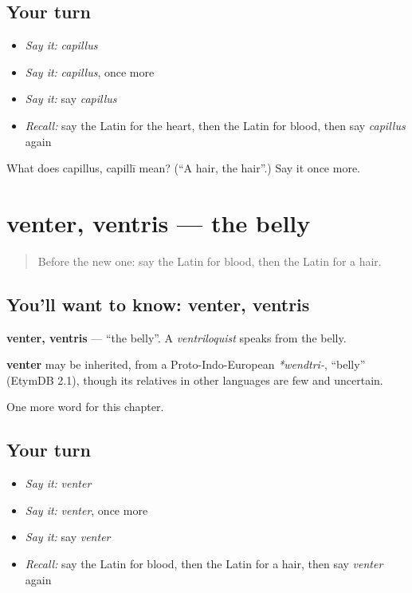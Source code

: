 \subsection*{Your turn}
\begin{itemize}
\raggedright
  \item \emph{Say it:} \emph{capillus}
  \item \emph{Say it:} \emph{capillus}, once more
  \item \emph{Say it:} say \emph{capillus}
  \item \emph{Recall:} say the Latin for the heart, then the Latin for blood, then say \emph{capillus} again
\end{itemize}

\begin{tcolorbox}[breakable,colback=teal!4,colframe=teal!35!black,title={Before you move on}]
What does capillus, capillī mean? (\textquotedblleft{}A hair, the hair\textquotedblright{}.) Say it once more.
\end{tcolorbox}
\section[venter, ventris]{venter, ventris — the belly}

\label{lesson:LA-C65-venter}



\begin{quote}
Before the new one: say the Latin for blood, then the Latin for a hair.
\end{quote}

\subsection*{You'll want to know: venter, ventris}
\textbf{venter, ventris} — \textquotedblleft{}the belly\textquotedblright{}. A \emph{ventriloquist} speaks from the belly.

\begin{cousinweb}
\textbf{venter} may be inherited, from a Proto-Indo-European \emph{*wendtri-}, \textquotedblleft{}belly\textquotedblright{} (EtymDB 2.1), though its relatives in other languages are few and uncertain.
\end{cousinweb}

\begin{grammarlens}[title={What you've built}]
One more word for this chapter.
\end{grammarlens}

\subsection*{Your turn}
\begin{itemize}
\raggedright
  \item \emph{Say it:} \emph{venter}
  \item \emph{Say it:} \emph{venter}, once more
  \item \emph{Say it:} say \emph{venter}
  \item \emph{Recall:} say the Latin for blood, then the Latin for a hair, then say \emph{venter} again
\end{itemize}

